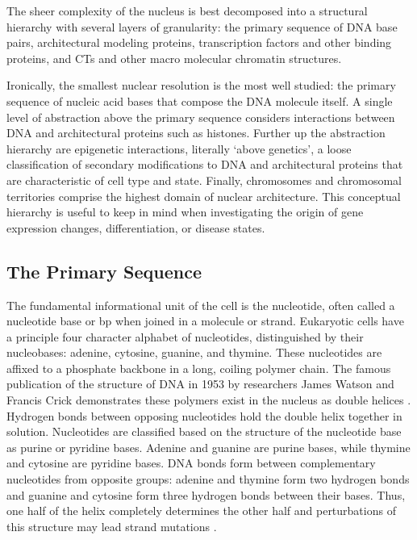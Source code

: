 The sheer complexity of the nucleus is best decomposed into a structural hierarchy with several layers of granularity: the primary
sequence of \gls{DNA} base pairs, architectural modeling proteins, transcription factors and other binding proteins, and \glspl{CT}
and other macro molecular chromatin structures.

Ironically, the smallest nuclear resolution is the most well studied: the primary sequence of nucleic acid bases that compose the \gls{DNA}
molecule itself.  A single level of abstraction above the primary sequence considers interactions between \gls{DNA} and  architectural
proteins such as histones.  Further up the abstraction hierarchy are \gls{epigenetic} interactions, literally `above genetics',
a loose classification of secondary modifications to \gls{DNA} and architectural proteins that are characteristic of cell type and state.
Finally, chromosomes and chromosomal territories comprise the highest domain of nuclear architecture.  This conceptual hierarchy is useful
to keep in mind when investigating the origin of gene expression changes, differentiation, or disease states.

\subsection*{The Primary Sequence}

The fundamental informational unit of the cell is the \gls{nucleotide}, often called a nucleotide base or \gls{bp} when joined in a
molecule or strand.  Eukaryotic cells have a principle four character alphabet of nucleotides, distinguished by their \glspl{nucleobase}:
adenine, cytosine, guanine, and thymine.  These nucleotides are affixed to a phosphate backbone in a long, coiling polymer chain.  The
famous publication of the structure of \gls{DNA} in 1953 by researchers James Watson and Francis Crick demonstrates these polymers
exist in the nucleus as double helices \citep{watson1953}.  Hydrogen bonds between opposing nucleotides hold the double helix together in solution.
Nucleotides are classified based on the structure of the nucleotide base as purine or pyridine bases.  Adenine and guanine are purine bases,
while thymine and cytosine are pyridine bases.  \gls{DNA} bonds form between complementary nucleotides from opposite groups: adenine and thymine form
two hydrogen bonds and guanine and cytosine form three hydrogen bonds between their bases.  Thus, one half of the helix completely
determines the other half and perturbations of this structure may lead strand mutations \citep{cox2008}.

